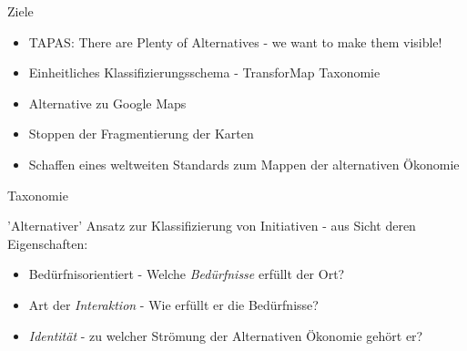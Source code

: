 \documentclass{beamer}
\begin{document}
\begin{frame}{Ziele}

\begin{itemize}
  \item TAPAS: There are Plenty of Alternatives - we want to make them visible!

\pause

  \item Einheitliches Klassifizierungsschema - TransforMap Taxonomie

\pause

  \item Alternative zu Google Maps
  \item Stoppen der Fragmentierung der Karten
  \item Schaffen eines weltweiten Standards zum Mappen der alternativen Ökonomie

\end{itemize}

\end{frame}




\begin{frame}{Taxonomie}

'Alternativer' Ansatz zur Klassifizierung von Initiativen - aus Sicht deren Eigenschaften:

\begin{itemize}
  \item Bedürfnisorientiert - Welche \emph{Bedürfnisse} erfüllt der Ort?

\pause

  \item Art der \emph{Interaktion} - Wie erfüllt er die Bedürfnisse?

\pause

  \item \emph{Identität} - zu welcher Strömung der Alternativen Ökonomie gehört er?

\end{itemize}

\end{frame}

\end{document}
